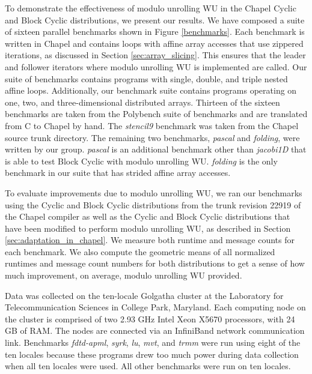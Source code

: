 To demonstrate the effectiveness of modulo unrolling WU in the Chapel Cyclic and Block Cyclic distributions, we present our results. We have composed a suite of sixteen parallel benchmarks shown in Figure \ref{benchmarks}. Each benchmark is written in Chapel and contains loops with affine array accesses that use zippered iterations, as discussed in Section \ref{sec:array_slicing}. This ensures that the leader and follower iterators where modulo unrolling WU is implemented are called. Our suite of benchmarks contains programs with single, double, and triple nested affine loops. Additionally, our benchmark suite contains programs operating on one, two, and three-dimensional distributed arrays. Thirteen of the sixteen benchmarks are taken from the Polybench suite of benchmarks \cite{polybench} and are translated from C to Chapel by hand. The \textit{stencil9} benchmark was taken from the Chapel source trunk directory. The remaining two benchmarks, \textit{pascal} and \textit{folding}, were written by our group. \textit{pascal} is an additional benchmark other than \textit{jacobi1D} that is able to test Block Cyclic with modulo unrolling WU. \textit{folding} is the only benchmark in our suite that has strided affine array accesses. 

To evaluate improvements due to modulo unrolling WU, we ran our benchmarks using the Cyclic and Block Cyclic distributions from the trunk revision 22919 of the Chapel compiler as well as the Cyclic and Block Cyclic distributions that have been modified to perform modulo unrolling WU, as described in Section \ref{sec:adaptation_in_chapel}. We measure both runtime and message counts for each benchmark. We also compute the geometric means of all normalized runtimes and message count numbers for both distributions to get a sense of how much improvement, on average, modulo unrolling WU provided. 

Data was collected on the ten-locale Golgatha cluster at the Laboratory for Telecommunication Sciences in College Park, Maryland. Each computing node on the cluster is comprised of two 2.93 GHz Intel Xeon X5670 processors, with 24 GB of RAM. The nodes are connected via an InfiniBand network communication link. Benchmarks \textit{fdtd-apml}, \textit{syrk}, \textit{lu}, \textit{mvt}, and \textit{trmm} were run using eight of the ten locales because these programs drew too much power during data collection when all ten locales were used. All other benchmarks were run on ten locales. 

